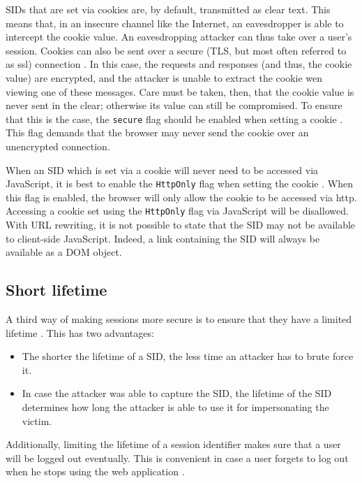 \label{secure-flag}SIDs that are set via cookies are, by default, transmitted as clear text. This means that, in an insecure channel like the Internet, an eavesdropper is able to intercept the cookie value. An eavesdropping attacker can thus take over a user's session. Cookies can also be sent over a secure (TLS, but most often referred to as \gls{ssl}) connection \cite{Stallings2011,rfc4346}. In this case, the requests and responses (and thus, the cookie value) are encrypted, and the attacker is unable to extract the cookie wen viewing one of these messages. Care must be taken, then, that the cookie value is never sent in the clear; otherwise its value can still be compromised. To ensure that this is the case, the \texttt{secure} flag should be enabled when setting a cookie \cite{Fu2001, rfc2965}. This flag demands that the browser may never send the cookie over an unencrypted connection.

When an SID which is set via a cookie will never need to be accessed via JavaScript, it is best to enable the \texttt{HttpOnly} flag when setting the cookie \cite{Nikiforakis2010}. When this flag is enabled, the browser will only allow the cookie to be accessed via \gls{http}. Accessing a cookie set using the \texttt{HttpOnly} flag via JavaScript will be disallowed. With URL rewriting, it is not possible to state that the SID may not be available to client-side JavaScript. Indeed, a link containing the SID will always be available as a DOM object.

\subsection{Short lifetime}\label{lifetime}
A third way of making sessions more secure is to ensure that they have a limited lifetime \cite{Fu2001}. This has two advantages:
\begin{itemize}
	\item The shorter the lifetime of a SID, the less time an attacker has to brute force it.
	\item In case the attacker was able to capture the SID, the lifetime of the SID determines how long the attacker is able to use it for impersonating the victim.
\end{itemize}

Additionally, limiting the lifetime of a session identifier makes sure that a user will be logged out eventually. This is convenient in case a user forgets to log out when he stops using the web application \cite{OWASP2009a}.

